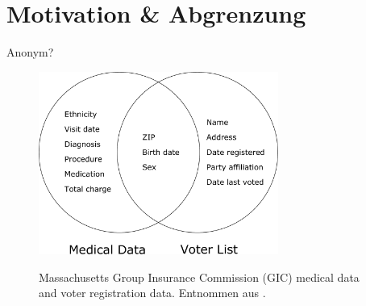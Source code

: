 \section{Motivation \& Abgrenzung}

\begin{frame}{Anonym?}
	\begin{figure}%
		\centering
		\includegraphics[width=0.7\textwidth]{pic/sweeney_governor.pdf}
		\vspace{0.2cm}
	
		\tiny Massachusetts Group Insurance Commission (GIC) medical data and voter registration data. Entnommen aus \cite{sweeney_k_anonymity}.
	\end{figure}

\end{frame}

